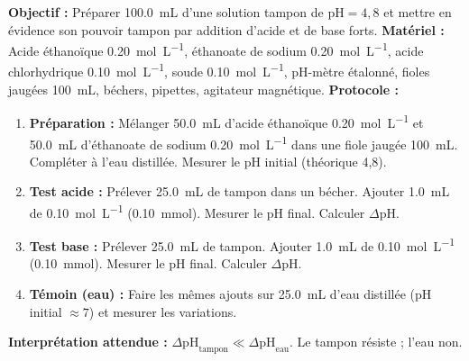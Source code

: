 \documentclass[11pt]{article}
\begin{document}
\begin{experience}
\textbf{Objectif :} Préparer \SI{100,0}{mL} d'une solution tampon de $\text{pH} = 4,8$ et mettre en évidence son pouvoir tampon par addition d'acide et de base forts.
\textbf{Matériel :} Acide éthanoïque \SI{0,20}{mol.L^{-1}}, éthanoate de sodium \SI{0,20}{mol.L^{-1}}, acide chlorhydrique \SI{0,10}{mol.L^{-1}}, soude \SI{0,10}{mol.L^{-1}}, pH-mètre étalonné, fioles jaugées \SI{100}{mL}, béchers, pipettes, agitateur magnétique.
\textbf{Protocole :}
\begin{enumerate}
\item \textbf{Préparation :} Mélanger \SI{50,0}{mL} d'acide éthanoïque \SI{0,20}{mol.L^{-1}} et \SI{50,0}{mL} d'éthanoate de sodium \SI{0,20}{mol.L^{-1}} dans une fiole jaugée \SI{100}{mL}. Compléter à l'eau distillée. Mesurer le pH initial (théorique 4,8).
\item \textbf{Test acide :} Prélever \SI{25,0}{mL} de tampon dans un bécher. Ajouter \SI{1,0}{mL} de  \SI{0,10}{mol.L^{-1}} (\SI{0,10}{mmol}). Mesurer le pH final. Calculer $\Delta\text{pH}$.
\item \textbf{Test base :} Prélever \SI{25,0}{mL} de tampon. Ajouter \SI{1,0}{mL} de  \SI{0,10}{mol.L^{-1}} (\SI{0,10}{mmol}). Mesurer le pH final. Calculer $\Delta\text{pH}$.
\item \textbf{Témoin (eau) :} Faire les mêmes ajouts sur \SI{25,0}{mL} d'eau distillée (pH initial $\approx 7$) et mesurer les variations.
\end{enumerate}
\textbf{Interprétation attendue :} $\Delta\text{pH}_{\text{tampon}} \ll \Delta\text{pH}_{\text{eau}}$. Le tampon résiste ; l'eau non.
\end{experience}
\end{document}
